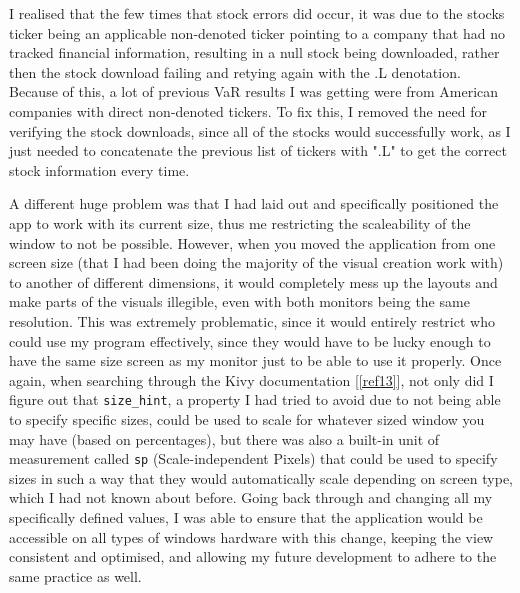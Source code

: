 \documentclass{article}
\begin{document}
I realised that the few times that stock errors did occur, it was due to the stocks ticker being an applicable non-denoted ticker pointing to a company that had no tracked financial information, resulting in a null stock being downloaded, rather then the stock download failing and retying again with the .L denotation. Because of this, a lot of previous VaR results I was getting were from American companies with direct non-denoted tickers. To fix this, I removed the need for verifying the stock downloads, since all of the stocks would successfully work, as I just needed to concatenate the previous list of tickers with ".L" to get the correct stock information every time.\\\vspace{0.3cm}

A different huge problem was that I had laid out and specifically positioned the app to work with its current size, thus me restricting the scaleability of the window to not be possible. However, when you moved the application from one screen size (that I had been doing the majority of the visual creation work with) to another of different dimensions, it would completely mess up the layouts and make parts of the visuals illegible, even with both monitors being the same resolution. This was extremely problematic, since it would entirely restrict who could use my program effectively, since they would have to be lucky enough to have the same size screen as my monitor just to be able to use it properly. Once again, when searching through the Kivy documentation [\ref{ref13}], not only did I figure out that \texttt{size\_hint}, a property I had tried to avoid due to not being able to specify specific sizes, could be used to scale for whatever sized window you may have (based on percentages), but there was also a built-in unit of measurement called \texttt{sp} (Scale-independent Pixels) that could be used to specify sizes in such a way that they would automatically scale depending on screen type, which I had not known about before. Going back through and changing all my specifically defined values, I was able to ensure that the application would be accessible on all types of windows hardware with this change, keeping the view consistent and optimised, and allowing my future development to adhere to the same practice as well.\\\vspace{0.3cm}
\end{document}
